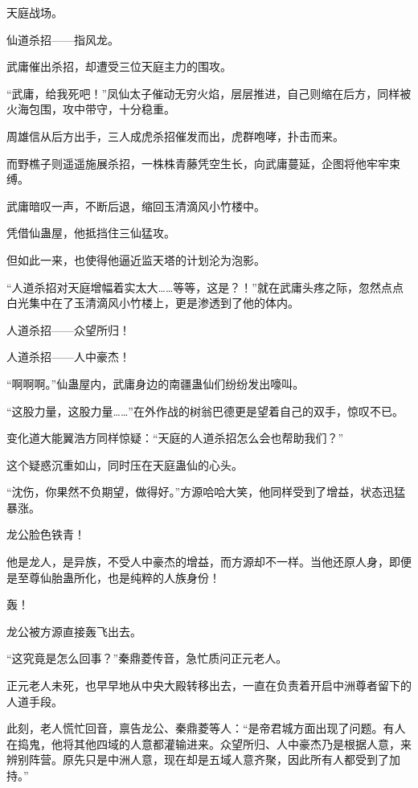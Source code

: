 
\begin{this_body}



天庭战场。

仙道杀招——指风龙。

武庸催出杀招，却遭受三位天庭主力的围攻。

“武庸，给我死吧！”凤仙太子催动无穷火焰，层层推进，自己则缩在后方，同样被火海包围，攻中带守，十分稳重。

周雄信从后方出手，三人成虎杀招催发而出，虎群咆哮，扑击而来。

而野樵子则遥遥施展杀招，一株株青藤凭空生长，向武庸蔓延，企图将他牢牢束缚。

武庸暗叹一声，不断后退，缩回玉清滴风小竹楼中。

凭借仙蛊屋，他抵挡住三仙猛攻。

但如此一来，也使得他逼近监天塔的计划沦为泡影。

“人道杀招对天庭增幅着实太大……等等，这是？！”就在武庸头疼之际，忽然点点白光集中在了玉清滴风小竹楼上，更是渗透到了他的体内。

人道杀招——众望所归！

人道杀招——人中豪杰！

“啊啊啊。”仙蛊屋内，武庸身边的南疆蛊仙们纷纷发出嚎叫。

“这股力量，这股力量……”在外作战的树翁巴德更是望着自己的双手，惊叹不已。

变化道大能翼浩方同样惊疑：“天庭的人道杀招怎么会也帮助我们？”

这个疑惑沉重如山，同时压在天庭蛊仙的心头。

“沈伤，你果然不负期望，做得好。”方源哈哈大笑，他同样受到了增益，状态迅猛暴涨。

龙公脸色铁青！

他是龙人，是异族，不受人中豪杰的增益，而方源却不一样。当他还原人身，即便是至尊仙胎蛊所化，也是纯粹的人族身份！

轰！

龙公被方源直接轰飞出去。

“这究竟是怎么回事？”秦鼎菱传音，急忙质问正元老人。

正元老人未死，也早早地从中央大殿转移出去，一直在负责着开启中洲尊者留下的人道手段。

此刻，老人慌忙回音，禀告龙公、秦鼎菱等人：“是帝君城方面出现了问题。有人在捣鬼，他将其他四域的人意都灌输进来。众望所归、人中豪杰乃是根据人意，来辨别阵营。原先只是中洲人意，现在却是五域人意齐聚，因此所有人都受到了加持。”


\end{this_body}
